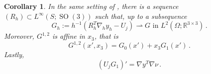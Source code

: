 \documentclass{article}
\theoremstyle{plain}
\theoremstyle{plain}
\newtheorem{cor}[teo]{Corollary}
\theoremstyle{plain}
\theoremstyle{plain}
\theoremstyle{plain}
\theoremstyle{definition}
\theoremstyle{definition}
\renewcommand{\r}{\mathbb{R}}
\newcommand{\todeb}{\rightharpoonup}
\DeclareMathOperator{\SO}{SO}
\begin{document}
\begin{cor}\label{cor:convergence_G_alpha_2}
    In the same setting of , there is a sequence $(R_h) \subset L^\infty(S; \SO(3))$ such that, up to a subsequence 
    \begin{equation}
        G_h := h^{-1}\left(R_h^T \nabla_h y_h - U_j\right) \todeb G \, \, \text{in} \, \, L^2(\Omega; \r^{3 \times 3}) \,. \label{eq:convergence_G_alpha_2}
    \end{equation}
    Moreover, $G^{1,2}$ is affine in $x_3$, that is
    \begin{equation}
        G^{1,2}(x', x_3) = G_0(x') + x_3 G_1(x') \,. \label{eq:linearity_G_alpha_2}
    \end{equation}
    Lastly,
    \begin{equation}
        (U_j G_1)' = \nabla y^T \nabla \nu \label{eq:G1_minor_gamma_equals_1} \,.
    \end{equation}
\end{cor}
\end{document}
